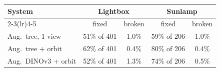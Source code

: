 \begin{tabular}{@{}lcccc@{}}
\toprule
System & \multicolumn{2}{c}{Lightbox} & \multicolumn{2}{c}{Sunlamp} \\ \cmidrule(lr){2-3}\cmidrule(lr){4-5}
 & fixed & broken & fixed & broken \\
\midrule
Aug.\ tree, 1 view & 51\% of 401 & 1.0\% & 59\% of 206 & 1.0\% \\
Aug.\ tree + orbit & 62\% of 401 & 0.4\% & 80\% of 206 & 0.4\% \\
Aug.\ DINOv3 + orbit & 52\% of 401 & 1.3\% & 74\% of 206 & 0.5\% \\
\bottomrule
\end{tabular}